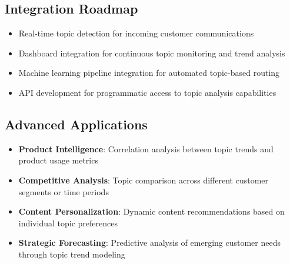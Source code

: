 \documentclass[11pt]{article}
\begin{document}
\subsection{Integration Roadmap}
\begin{itemize}
\item Real-time topic detection for incoming customer communications
\item Dashboard integration for continuous topic monitoring and trend analysis
\item Machine learning pipeline integration for automated topic-based routing
\item API development for programmatic access to topic analysis capabilities
\end{itemize}

\subsection{Advanced Applications}
\begin{itemize}
\item \textbf{Product Intelligence}: Correlation analysis between topic trends and product usage metrics
\item \textbf{Competitive Analysis}: Topic comparison across different customer segments or time periods
\item \textbf{Content Personalization}: Dynamic content recommendations based on individual topic preferences
\item \textbf{Strategic Forecasting}: Predictive analysis of emerging customer needs through topic trend modeling
\end{itemize}
\end{document}
